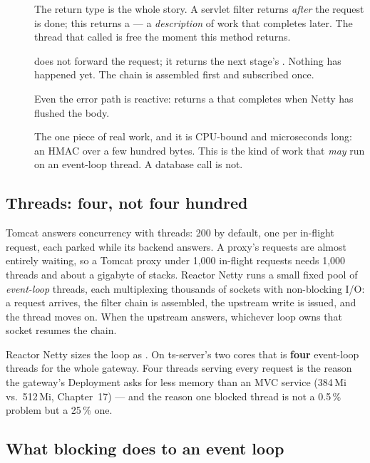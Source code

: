 \begin{description}
  \item[] The return type is the whole story. A servlet filter
  returns  \emph{after} the request is done; this returns a
   --- a \emph{description} of work that completes
  later. The thread that called  is free the moment this
  method returns.
  \item[]  does not forward the
  request; it returns the next stage's . Nothing has happened
  yet. The chain is assembled first and subscribed once.
  \item[] Even the error path is reactive:  returns
  a  that completes when Netty has flushed the body.
  \item[] The one piece of real work, and it is CPU-bound and
  microseconds long: an HMAC over a few hundred bytes. This is the kind
  of work that \emph{may} run on an event-loop thread. A database call
  is not.
\end{description}

\subsection{Threads: four, not four hundred}

Tomcat answers concurrency with threads: 200 by default, one per
in-flight request, each parked while its backend answers. A proxy's
requests are almost entirely waiting, so a Tomcat proxy under 1{,}000
in-flight requests needs 1{,}000 threads and about a gigabyte of stacks.
Reactor Netty runs a small fixed pool of \emph{event-loop} threads, each
multiplexing thousands of sockets with non-blocking I/O: a request
arrives, the filter chain is assembled, the upstream write is issued, and
the thread moves on. When the upstream answers, whichever loop owns that
socket resumes the chain.

\begin{hardware}
Reactor Netty sizes the loop as .
On ts-server's two cores that is \textbf{four} event-loop threads for
the whole gateway. Four threads serving every request is the reason the
gateway's Deployment asks for less memory than an MVC service
(384\,Mi vs.\ 512\,Mi, Chapter~17) --- and the reason one blocked thread
is not a 0.5\,\% problem but a 25\,\% one.
\end{hardware}

\subsection{What blocking does to an event loop}

